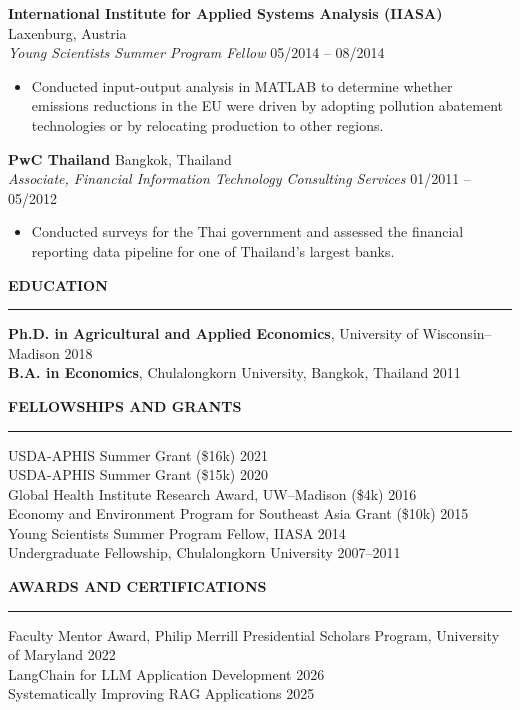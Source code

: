 \documentclass[11pt,letterpaper]{article}
\renewcommand{\section}[1]{%
  \par\vspace{10pt}%
  {\large\bfseries\color{accent}#1}\par\vspace{-3pt}%
  {\color{accent}\rule{\linewidth}{0.6pt}}\par\vspace{4pt}}
\newcommand{\entry}[4]{%
  \textbf{#1} \hfill #2 \\
  \textit{#3} \hfill #4 \par\vspace{1pt}}
\newcommand{\oneline}[2]{#1 \hfill #2 \\}
\begin{document}
\vspace{10pt}
\entry{International Institute for Applied Systems Analysis (IIASA)}{Laxenburg, Austria}{Young Scientists Summer Program Fellow}{05/2014 -- 08/2014}
\begin{itemize}
  \item Conducted input-output analysis in MATLAB to determine whether emissions reductions in the EU were driven by adopting pollution abatement technologies or by relocating production to other regions.
\end{itemize}

\vspace{10pt}
\entry{PwC Thailand}{Bangkok, Thailand}{Associate, Financial Information Technology Consulting Services}{01/2011 -- 05/2012}
\begin{itemize}
  \item Conducted surveys for the Thai government and assessed the financial reporting data pipeline for one of Thailand's largest banks.
\end{itemize}

\section{EDUCATION}
\oneline{\textbf{Ph.D. in Agricultural and Applied Economics}, University of Wisconsin--Madison}{2018}
\oneline{\textbf{B.A. in Economics}, Chulalongkorn University, Bangkok, Thailand}{2011}

\section{FELLOWSHIPS AND GRANTS}
\oneline{USDA-APHIS Summer Grant (\$16k)}{2021}
\oneline{USDA-APHIS Summer Grant (\$15k)}{2020}
\oneline{Global Health Institute Research Award, UW--Madison (\$4k)}{2016}
\oneline{Economy and Environment Program for Southeast Asia Grant (\$10k)}{2015}
\oneline{Young Scientists Summer Program Fellow, IIASA}{2014}
\oneline{Undergraduate Fellowship, Chulalongkorn University}{2007--2011}

\section{AWARDS AND CERTIFICATIONS}
\oneline{Faculty Mentor Award, Philip Merrill Presidential Scholars Program, University of Maryland}{2022}
\oneline{LangChain for LLM Application Development}{2026}
\oneline{Systematically Improving RAG Applications}{2025}
\end{document}

